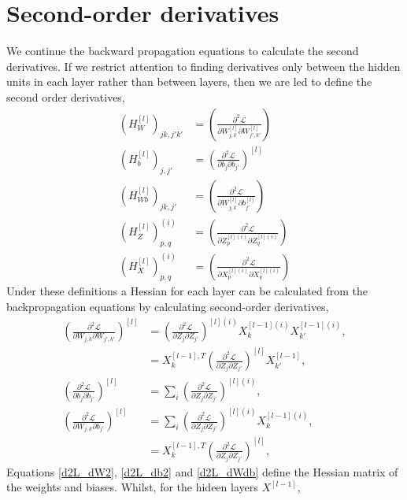 \documentclass[11pt,twocolumn]{article}
\begin{document}
\section{Second-order derivatives}\label{Hess_prop}
We continue the backward propagation equations to calculate the second derivatives. If we restrict attention to finding derivatives only between the hidden units in each layer rather than between layers, then we are led to define the second order derivatives,
\begin{align}
(H_W^{[l]})_{jk,j'k'}&=\left(\frac{\partial^2 \mathcal{L}}{\partial W^{[l]}_{j,k} \partial W^{[l]}_{j',k'}}\right)\label{H_W}\\
(H_b^{[l]})_{j,j'}&=\left(\frac{\partial^2 \mathcal{L}}{\partial b_{j} \partial b_{j'}}\right)^{[l]}\\
(H_{Wb}^{[l]})_{jk,j'}&=\left(\frac{\partial^2 \mathcal{L}}{\partial W^{[l]}_{j,k} \partial b^{[l]}_{j'}}\right)\\
(H_Z^{[l]})^{(i)}_{p,q}&=\left(\frac{\partial^2 \mathcal{L}}{\partial Z_{p}^{[l](i)} \partial Z_{q}^{[l](i)}}\right)\\
(H_X^{[l]})^{(i)}_{p,q}&=\left(\frac{\partial^2 \mathcal{L}}{\partial X_{p}^{[l](i)} \partial X_{q}^{[l](i)}}\right)\label{H_X}
\end{align}
Under these definitions a Hessian for each layer can be calculated from the backpropagation equations by calculating second-order derivatives,
\begin{align}
\left(\frac{\partial^2 \mathcal{L}}{\partial W_{j,k} \partial W_{j',k'}}\right)^{[l]}&=\left(\frac{\partial^2 \mathcal{L}}{\partial Z_{j}\partial Z_{j'}}\right)^{[l](i)}X_{k}^{[l-1](i)}X_{k'}^{[l-1](i)},\\
&=X_{k}^{[l-1],T}\left(\frac{\partial^2 \mathcal{L}}{\partial Z_{j}\partial Z_{j'}}\right)^{[l]}X_{k'}^{[l-1]},\label{d2L_dW2}\\
\left(\frac{\partial^2 \mathcal{L}}{\partial b_{j}\partial b_{j'}}\right)^{[l]}&=\sum_{i}\left(\frac{\partial^2 \mathcal{L}}{\partial Z_{j} \partial Z_{j'} }\right)^{[l](i)},\label{d2L_db2}\\
\left(\frac{\partial^2 \mathcal{L}}{\partial W_{j,k} \partial b_{j'}}\right)^{[l]}&=\sum_{i}\left(\frac{\partial^2 \mathcal{L}}{\partial Z_{j}\partial Z_{j'}}\right)^{[l](i)}X_{k}^{[l-1](i)},\\
&=X_{k}^{[l-1],T}\left(\frac{\partial^2 \mathcal{L}}{\partial Z_{j}\partial Z_{j'}}\right)^{[l]}\label{d2L_dWdb},
\end{align}
Equations \ref{d2L_dW2}, \ref{d2L_db2} and \ref{d2L_dWdb} define the Hessian matrix of the weights and biases. Whilst, for the hideen layers $X^{[l-1]}$,
\end{document}
